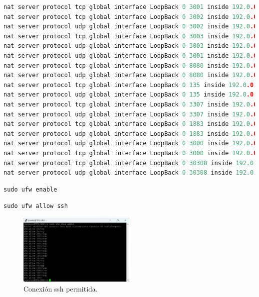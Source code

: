 \begin{lstlisting}[language=cpp, firstnumber=0, basicstyle=\normalsize, caption={Comandos para reaperturar y redirigir puertos.}] 
nat server protocol tcp global interface LoopBack 0 3001 inside 192.0.0.6 ftp
nat server protocol tcp global interface LoopBack 0 3002 inside 192.0.0.6 22
nat server protocol udp global interface LoopBack 0 3002 inside 192.0.0.6 22
nat server protocol tcp global interface LoopBack 0 3003 inside 192.0.0.6 www
nat server protocol udp global interface LoopBack 0 3003 inside 192.0.0.6 80
nat server protocol udp global interface LoopBack 0 3001 inside 192.0.0.6 21
nat server protocol tcp global interface LoopBack 0 8080 inside 192.0.0.6 8080
nat server protocol udp global interface LoopBack 0 8080 inside 192.0.0.6 8080
nat server protocol tcp global interface LoopBack 0 135 inside 192.0.0.6 135
nat server protocol udp global interface LoopBack 0 135 inside 192.0.0.6 135
nat server protocol tcp global interface LoopBack 0 3307 inside 192.0.0.6 3307
nat server protocol udp global interface LoopBack 0 3307 inside 192.0.0.6 3307
nat server protocol tcp global interface LoopBack 0 1883 inside 192.0.0.6 1883
nat server protocol udp global interface LoopBack 0 1883 inside 192.0.0.6 1883
nat server protocol udp global interface LoopBack 0 3000 inside 192.0.0.6 3000
nat server protocol tcp global interface LoopBack 0 3000 inside 192.0.0.6 3000
nat server protocol tcp global interface LoopBack 0 30308 inside 192.0.0.6 3308
nat server protocol udp global interface LoopBack 0 30308 inside 192.0.0.6 3308
\end{lstlisting}

\begin{lstlisting}[language=cpp, firstnumber=0, basicstyle=\normalsize, caption={Comando para activar el firewall.}] 
sudo ufw enable\end{lstlisting}

\begin{lstlisting}[language=cpp, firstnumber=0, basicstyle=\normalsize, caption={Comando para permitir conexión ssh.}] 
sudo ufw allow ssh\end{lstlisting}

\begin{figure}[h]
\centering
\includegraphics[width=0.5\textwidth]{img/desarrollo/ufw_ShowAdded.png}
\caption{Conexión ssh permitida.}
\end{figure}

